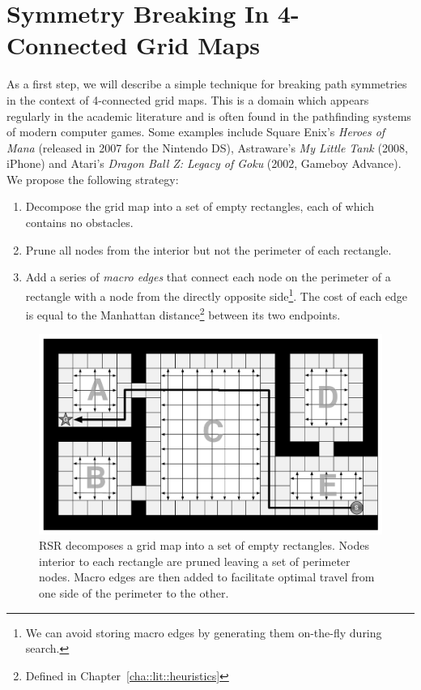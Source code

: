 \section{Symmetry Breaking In 4-Connected Grid Maps}
\label{cha::rsr::symm4c}

As a first step, we will describe a simple technique for breaking path symmetries 
in the context of 4-connected grid maps.
This is a domain which appears regularly in the academic literature
\citep{yap02,wang08,pochter10} and is often found in the pathfinding systems of
modern computer games.  Some examples include Square Enix's \emph{Heroes of
Mana} (released in 2007 for the Nintendo DS), Astraware's \emph{My Little Tank}
(2008, iPhone) and Atari's \emph{Dragon Ball Z: Legacy of Goku} (2002, Gameboy
Advance). We propose the following strategy:

\begin{enumerate}
\item{Decompose the grid map into a set of empty rectangles, each of which contains no obstacles.}
\item{Prune all nodes from the interior but not the perimeter of each rectangle.}
\item{Add a series of \emph{macro edges} that connect each node on the perimeter of a rectangle
with a node from the directly opposite side\footnote{We can avoid storing
macro edges by generating them on-the-fly during search.}.  The cost of each
edge is equal to the Manhattan distance\footnote{Defined in
Chapter~\ref{cha::lit::heuristics}} between its two endpoints.
}
\end{enumerate}

\begin{figure}[t]
\begin{center}
\includegraphics[scale=0.30, trim = 10mm 10mm 10mm 0mm]{chapter_rsr/diagrams/4c_example.pdf}
\end{center}
\vspace{-3pt}
\caption[Rectangular Symmetry Reduction on 4-connected maps]{
\small
RSR decomposes a grid map into a set of empty rectangles. 
Nodes interior to each rectangle are pruned leaving a set of perimeter nodes.
Macro edges are then added to facilitate optimal travel from one side of the perimeter to the other.}
\label{fig::rsr::overview}
\end{figure}

